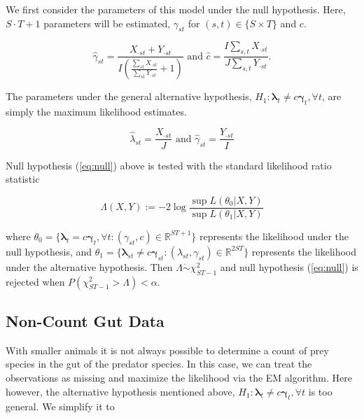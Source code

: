\documentclass[12pt]{article}\usepackage[]{graphicx}\usepackage[]{color}
\begin{document}
We first consider the parameters of this model under the null hypothesis.  Here, $S\cdot T + 1$ parameters will be estimated, $\gamma_{st}$ for $(s,t) \in \{S \times T\}$ and $c$. 

\begin{equation*}
  \hat{\gamma}_{st} = \frac{X_{\cdot st} + Y_{\cdot st}}{I\left(\frac{\sum_{st} X_{\cdot st}}{\sum_{st}Y_{\cdot st}} +1 \right)} \text{ and } \hat{c} = \frac{I\sum_{s,t} X_{\cdot st}}{J\sum_{s,t} Y_{\cdot st}}.
\end{equation*}

The parameters under the general alternative hypothesis,  $H_1:   \boldsymbol{\lambda}_t \ne c \boldsymbol{\gamma}_t, \forall t$, are simply the maximum likelihood estimates.

\begin{equation*}
  \hat{\lambda}_{st} = \frac{X_{\cdot st}}{J} \text{ and } \hat{\gamma}_{st} = \frac{Y_{\cdot st}}{I}
\end{equation*}

Null hypothesis (\ref{eq:null}) above is tested with the standard likelihood ratio statistic

\begin{equation}
  \label{eq:lrt}
  \Lambda(X,Y) := -2 \log{ \frac{ \sup L(\theta_0|X,Y)}{ \sup L(\theta_1|X,Y)} }
\end{equation}

where $\theta_0 = \{ \boldsymbol{\lambda}_t = c \boldsymbol{\gamma}_t, \forall t : (\gamma_{st}, c) \in \mathbb{R}^{ST+1} \}$ represents the likelihood under the null hypothesis, and $\theta_1 = \{ \boldsymbol{\lambda}_{st} \ne c \boldsymbol{\gamma}_{st} : (\lambda_{st}, \gamma_{st}) \in \mathbb{R}^{2ST} \}$ represents the likelihood under the alternative hypothesis.  Then $\Lambda \dot{\sim} \chi^2_{ST-1}$ and null hypothesis (\ref{eq:null}) is rejected when $P(\chi^2_{ST-1} > \Lambda) < \alpha$. 

\subsection{Non-Count Gut Data}

With smaller animals it is not always possible to determine a count of prey species in the gut of the predator species.  In this case, we can treat the observations as missing and maximize the likelihood via the EM algorithm.  Here however, the alternative hypothesis mentioned above, $H_1:   \boldsymbol{\lambda}_t \ne c \boldsymbol{\gamma}_t, \forall t$ is too general.  We simplify it to 
\end{document}
